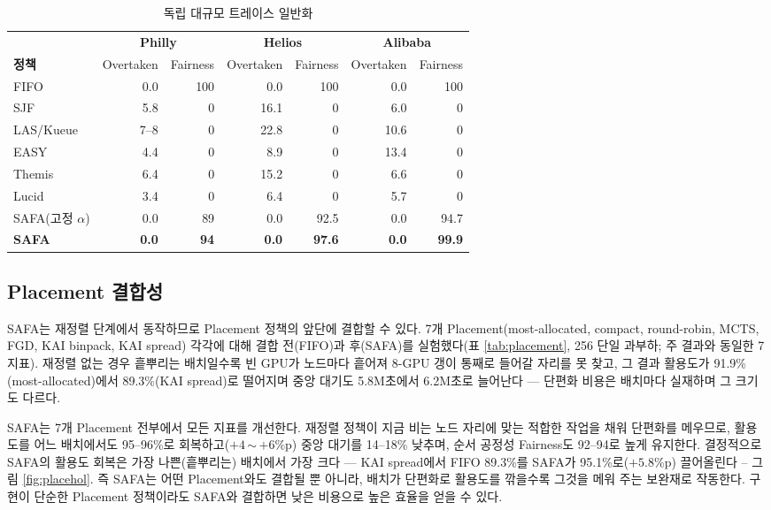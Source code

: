\documentclass{ieeetj}
\begin{document}
\begin{table}[htb!]
\centering
\caption{독립 대규모 트레이스 일반화}
\label{tab:trace3}
\scriptsize
\setlength{\tabcolsep}{4pt}
\begin{tabular}{@{}l@{\hspace{0.6em}}rr@{\hspace{0.9em}}rr@{\hspace{0.9em}}rr@{}}
\toprule
 & \multicolumn{2}{c}{\textbf{Philly}} & \multicolumn{2}{c}{\textbf{Helios}} & \multicolumn{2}{c}{\textbf{Alibaba}} \\
\cmidrule(lr){2-3}\cmidrule(lr){4-5}\cmidrule(lr){6-7}
\textbf{정책} & Overtaken & Fairness & Overtaken & Fairness & Overtaken & Fairness \\
\midrule
FIFO          & 0.0   & 100  & 0.0  & 100  & 0.0  & 100 \\
SJF           & 5.8   & 0    & 16.1 & 0    & 6.0  & 0 \\
LAS/Kueue     & 7--8  & 0    & 22.8 & 0    & 10.6 & 0 \\
EASY          & 4.4   & 0    & 8.9  & 0    & 13.4 & 0 \\
Themis        & 6.4   & 0    & 15.2 & 0    & 6.6  & 0 \\
Lucid         & 3.4   & 0    & 6.4  & 0    & 5.7  & 0 \\
SAFA(고정 $\alpha$) & 0.0 & 89 & 0.0 & 92.5 & 0.0 & 94.7 \\
\textbf{SAFA} & \textbf{0.0} & \textbf{94} & \textbf{0.0} & \textbf{97.6} & \textbf{0.0} & \textbf{99.9} \\
\bottomrule
\end{tabular}
\end{table}

\subsection{Placement 결합성}\label{eval:robust:placement}
SAFA는 재정렬 단계에서 동작하므로 Placement 정책의 앞단에 결합할 수 있다. 7개 Placement(most-allocated, compact, round-robin, MCTS, FGD, KAI binpack, KAI spread) 각각에 대해 결합 전(FIFO)과 후(SAFA)를 실험했다(표 \ref{tab:placement}, 256 단일 과부하; 주 결과와 동일한 7지표). 재정렬 없는 경우 흩뿌리는 배치일수록 빈 GPU가 노드마다 흩어져 8-GPU 갱이 통째로 들어갈 자리를 못 찾고, 그 결과 활용도가 91.9\%(most-allocated)에서 89.3\%(KAI spread)로 떨어지며 중앙 대기도 5.8M초에서 6.2M초로 늘어난다 --- 단편화 비용은 배치마다 실재하며 그 크기도 다르다.

SAFA는 7개 Placement 전부에서 모든 지표를 개선한다. 재정렬 정책이 지금 비는 노드 자리에 맞는 적합한 작업을 채워 단편화를 메우므로, 활용도를 어느 배치에서도 95--96\%로 회복하고($+4$\,$\sim$\,$+6$\%p) 중앙 대기를 14--18\% 낮추며, 순서 공정성 Fairness도 92--94로 높게 유지한다. 결정적으로 SAFA의 활용도 회복은 가장 나쁜(흩뿌리는) 배치에서 가장 크다 --- KAI spread에서 FIFO 89.3\%를 SAFA가 95.1\%로($+5.8$\%p) 끌어올린다 -- 그림 \ref{fig:placehol}. 즉 SAFA는 어떤 Placement와도 결합될 뿐 아니라, 배치가 단편화로 활용도를 깎을수록 그것을 메워 주는 보완재로 작동한다. 구현이 단순한 Placement 정책이라도 SAFA와 결합하면 낮은 비용으로 높은 효율을 얻을 수 있다.
\end{document}
